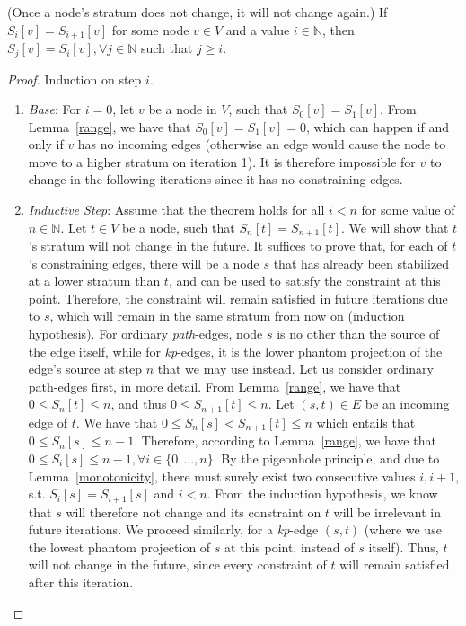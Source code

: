 \begin{thm}\label{stability} (Once a node's stratum does not change,
  it will not change again.)
  If $S_{i}[v] = S_{i+1}[v]$ for some node $v \in V$ and a value $i
  \in \mathbb{N}$, then $S_{j}[v] = S_{i}[v], \forall j \in
  \mathbb{N}$ such that $j \geq i$.
\end{thm}

\begin{proof}
  Induction on step $i$.

  \begin{enumerate}
  \item \emph{Base}: For $i = 0$, let $v$ be a node in $V$, such that
    $S_0[v] = S_{1}[v]$. From Lemma~\ref{range}, we have that $S_0[v]
    = S_{1}[v] = 0$, which can happen if and only if $v$ has no
    incoming edges (otherwise an edge would cause the node to move to
    a higher stratum on iteration 1). It is therefore impossible for
    $v$ to change in the following iterations since it has no
    constraining edges.
  \item \emph{Inductive Step}: Assume that the theorem holds for all $i
    < n$ for some value of $n \in \mathbb{N}$. Let $t \in V$ be a
    node, such that $S_n[t] = S_{n+1}[t]$.  We will show that $t$'s stratum will
    not change in the future. It suffices to prove that, for each of
    $t$'s constraining edges, there will be a node $s$ that has
    already been stabilized at a lower stratum than $t$, and can be
    used to satisfy the constraint at this point. Therefore, the
    constraint will remain satisfied in future iterations due to $s$,
    which will remain in the same stratum from now on (induction
    hypothesis). For ordinary \emph{path}-edges, node $s$ is no other
    than the source of the edge itself, while for \emph{kp}-edges,
    it is the lower phantom projection of the edge's source at step
    $n$ that we may use instead. Let us consider ordinary path-edges
    first, in more detail. From Lemma~\ref{range}, we have that $0
    \leq S_n[t] \leq n$, and thus $0 \leq S_{n+1}[t] \leq n$.  Let
    $(s,t) \in E$ be an incoming edge of $t$. We have that $0\leq
    S_{n}[s] < S_{n+1}[t] \leq n$ which entails that $0 \leq S_{n}[s]
    \leq n - 1$.  Therefore, according to Lemma~\ref{range}, we have
    that $0 \leq S_{i}[s] \leq n - 1, \forall i \in \{0,\ldots{},n\}$.
    By the pigeonhole principle, and due to Lemma~\ref{monotonicity},
    there must surely exist two consecutive values $i,i+1$,
    s.t. $S_i[s] = S_{i+1}[s]$ and $i < n$. From the induction
    hypothesis, we know that $s$ will therefore not change and its
    constraint on $t$ will be irrelevant in future iterations. We
    proceed similarly, for a \emph{kp}-edge $(s,t)$ (where we use
    the lowest phantom projection of $s$ at this point, instead of $s$
    itself). Thus, $t$ will not change in the future, since every
    constraint of $t$ will remain satisfied after this iteration.
  \end{enumerate}
\end{proof}

